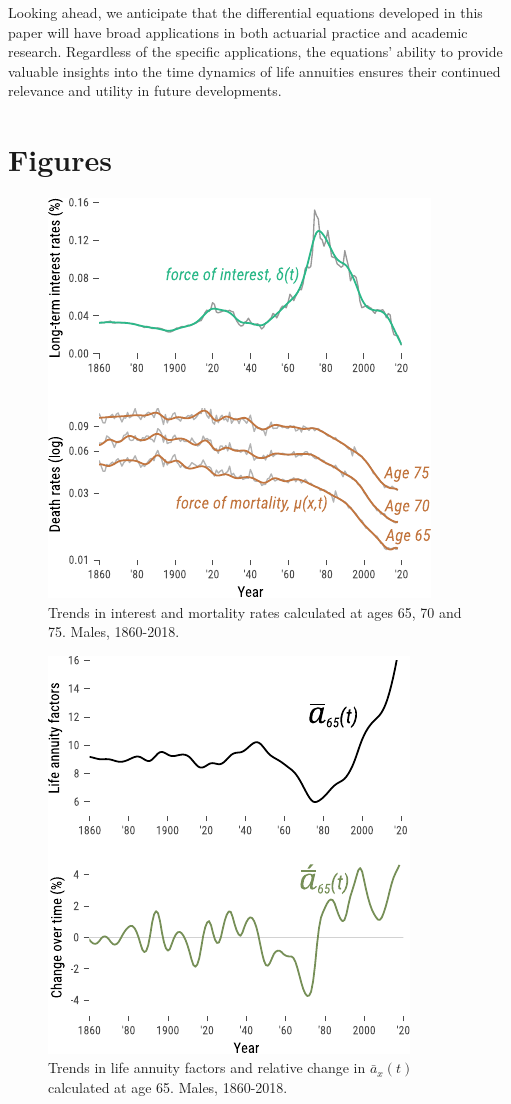 \documentclass[12pt]{article}
\begin{document}
Looking ahead, we anticipate that the differential equations developed in this paper will have broad applications in both actuarial practice and academic research. Regardless of the specific applications, the equations' ability to provide valuable insights into the time dynamics of life annuities ensures their continued relevance and utility in future developments.




\newpage


%
%



\newpage

\FloatBarrier
\section{Figures}

\begin{figure}[!ht]
	\centering
	\includegraphics[width=0.5\linewidth]{Fig/deltamu}
	\caption{{Trends in interest and mortality rates calculated at ages 65, 70 and 75. Males, 1860-2018.}}
	\label{fig:Fig1}
\end{figure}


 \begin{figure}[!ht]
	\centering
	\includegraphics[width=0.5\linewidth]{Fig/axm}
	\caption{{Trends in life annuity factors and relative change in $\bar{a}_x(t)$ calculated at age 65. Males, 1860-2018.}}
	\label{fig:Fig2}
\end{figure}
\end{document}

